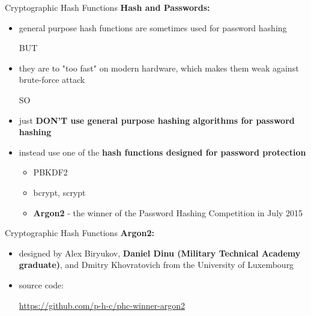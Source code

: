 \documentclass[pdf]{beamer}
\begin{document}
\begin{frame}{Cryptographic Hash Functions}
\textbf{Hash and Passwords:}
\begin{itemize}
\item
general purpose hash functions are sometimes used for password hashing

BUT 

\item
they are to "too fast" on modern hardware, which makes them weak against brute-force attack

SO

\item
just \textbf{DON'T use general purpose hashing algorithms for password hashing}

\item
instead use one of the \textbf{hash functions designed for password protection}

\begin{itemize}
\item
PBKDF2 
\item
bcrypt, scrypt
\item
\textbf{Argon2} - the winner of the Password Hashing Competition in July 2015
\end{itemize}

\end{itemize}
\end{frame}



\begin{frame}{Cryptographic Hash Functions}
\textbf{Argon2:}
\begin{itemize}
\item
designed by Alex Biryukov, \textbf{Daniel Dinu (Military Technical Academy graduate)}, and Dmitry Khovratovich from the University of Luxembourg

\item
source code: 

\url{https://github.com/p-h-c/phc-winner-argon2}

\end{itemize}
\end{frame}
\end{document}

